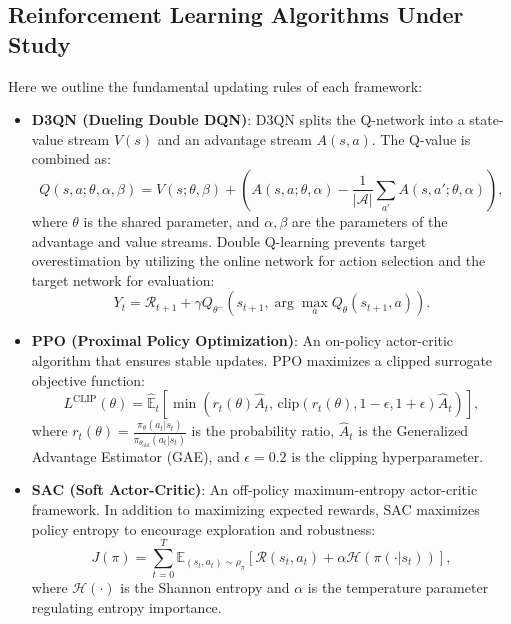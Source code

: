 \documentclass[journal,onecolumn]{IEEEtran}
\begin{document}
\subsection{Reinforcement Learning Algorithms Under Study}
Here we outline the fundamental updating rules of each framework:
\begin{itemize}
    \item \textbf{D3QN (Dueling Double DQN)}:
    D3QN splits the Q-network into a state-value stream $V(s)$ and an advantage stream $A(s, a)$. The Q-value is combined as:
    \begin{equation}
        Q(s, a; \theta, \alpha, \beta) = V(s; \theta, \beta) + \left( A(s, a; \theta, \alpha) - \frac{1}{|\mathcal{A}|} \sum_{a'} A(s, a'; \theta, \alpha) \right),
    \end{equation}
    where $\theta$ is the shared parameter, and $\alpha, \beta$ are the parameters of the advantage and value streams. Double Q-learning prevents target overestimation by utilizing the online network for action selection and the target network for evaluation:
    \begin{equation}
    Y_t
    =
    \mathcal{R}_{t+1}
    +
    \gamma
    Q_{\theta^-}
    \!\left(
    s_{t+1},
    \arg\max_{a} Q_{\theta}(s_{t+1},a)
    \right).
    \end{equation}
    

    \item \textbf{PPO (Proximal Policy Optimization)}:
    An on-policy actor-critic algorithm that ensures stable updates. PPO maximizes a clipped surrogate objective function:
    \begin{equation}
        L^{\text{CLIP}}(\theta) = \hat{\mathbb{E}}_t \left[ \min\left( r_t(\theta) \hat{A}_t, \, \text{clip}(r_t(\theta), 1 - \epsilon, 1 + \epsilon) \hat{A}_t \right) \right],
    \end{equation}
    where $r_t(\theta) = \frac{\pi_\theta(a_t | s_t)}{\pi_{\theta_{\text{old}}}(a_t | s_t)}$ is the probability ratio, $\hat{A}_t$ is the Generalized Advantage Estimator (GAE), and $\epsilon = 0.2$ is the clipping hyperparameter.

    \item \textbf{SAC (Soft Actor-Critic)}:
    An off-policy maximum-entropy actor-critic framework. In addition to maximizing expected rewards, SAC maximizes policy entropy to encourage exploration and robustness:
    \begin{equation}
        J(\pi) = \sum_{t=0}^T \mathbb{E}_{(s_t, a_t) \sim \rho_\pi} \left[ \mathcal{R}(s_t, a_t) + \alpha \mathcal{H}\left( \pi(\cdot | s_t) \right) \right],
    \end{equation}
    where $\mathcal{H}(\cdot)$ is the Shannon entropy and $\alpha$ is the temperature parameter regulating entropy importance.


\end{itemize}
\end{document}
